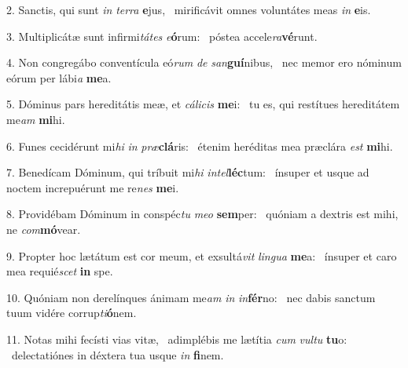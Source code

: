 2. Sanctis, qui sunt \textit{in} \textit{ter}\textit{ra} \textbf{e}jus, \ast\  mirificávit omnes voluntátes meas \textit{in} \textbf{e}is.\

3. Multiplicátæ sunt infirmi\textit{tá}\textit{tes} \textit{e}\textbf{ó}rum: \ast\  póstea accele\textit{ra}\textbf{vé}runt.\

4. Non congregábo conventícula eó\textit{rum} \textit{de} \textit{san}\textbf{guí}nibus, \ast\  nec memor ero nóminum eórum per lábi\textit{a} \textbf{me}a.\

5. Dóminus pars hereditátis meæ, et \textit{cá}\textit{li}\textit{cis} \textbf{me}i: \ast\  tu es, qui restítues hereditátem me\textit{am} \textbf{mi}hi.\

6. Funes cecidérunt mi\textit{hi} \textit{in} \textit{præ}\textbf{clá}ris: \ast\  étenim heréditas mea præclára \textit{est} \textbf{mi}hi.\

7. Benedícam Dóminum, qui tríbuit mi\textit{hi} \textit{in}\textit{tel}\textbf{léc}tum: \ast\  ínsuper et usque ad noctem increpuérunt me re\textit{nes} \textbf{me}i.\

8. Providébam Dóminum in conspéc\textit{tu} \textit{me}\textit{o} \textbf{sem}per: \ast\  quóniam a dextris est mihi, ne \textit{com}\textbf{mó}vear.\

9. Propter hoc lætátum est cor meum, et exsultá\textit{vit} \textit{lin}\textit{gua} \textbf{me}a: \ast\  ínsuper et caro mea requié\textit{scet} \textbf{in} spe.\

10. Quóniam non derelínques ánimam me\textit{am} \textit{in} \textit{in}\textbf{fér}no: \ast\  nec dabis sanctum tuum vidére corrup\textit{ti}\textbf{ó}nem.\

11. Notas mihi fecísti vias vitæ, \dag\  adimplébis me lætítia \textit{cum} \textit{vul}\textit{tu} \textbf{tu}o: \ast\  delectatiónes in déxtera tua usque \textit{in} \textbf{fi}nem.\

